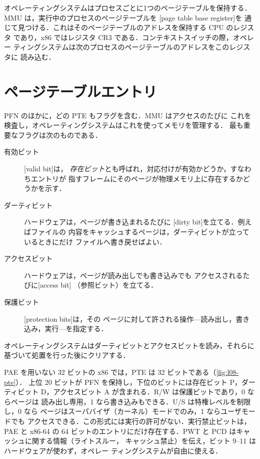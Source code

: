 \documentclass[../main.tex]{subfiles}
\begin{document}
オペレーティングシステムはプロセスごとに1つのページテーブルを保持する．MMU
は，実行中のプロセスのページテーブルを
[page table base register]を
通じて見つける．これはそのページテーブルのアドレスを保持する CPU のレジスタ
であり，x86 ではレジスタ CR3 である．コンテキストスイッチの際，オペレー
ティングシステムは次のプロセスのページテーブルのアドレスをこのレジスタに
読み込む．

\section{ページテーブルエントリ}
\label{sec:l08-pte}

PFN のほかに，どの PTE もフラグを含む．MMU はアクセスのたびに
これを検査し，オペレーティングシステムはこれを使ってメモリを管理する．
最も重要なフラグは次のものである．
\begin{description}
  \item[有効ビット] [valid bit]は，
    \emph{存在ビット}とも呼ばれ，対応付けが有効かどうか，すなわちエントリが
    指すフレームにそのページが物理メモリ上に存在するかどうかを示す．
  \item[ダーティビット] ハードウェアは，ページが書き込まれるたびに
    [dirty bit]を立てる．例えばファイルの
    内容をキャッシュするページは，ダーティビットが立っているときにだけ
    ファイルへ書き戻せばよい．
  \item[アクセスビット] ハードウェアは，ページが読み出しでも書き込みでも
    アクセスされるたびに[access bit]
    （参照ビット）を立てる．
  \item[保護ビット] [protection bits]は，その
    ページに対して許される操作---読み出し，書き込み，実行---を指定する．
\end{description}
オペレーティングシステムはダーティビットとアクセスビットを読み，それらに
基づいて処置を行った後にクリアする．

PAE を用いない 32 ビットの x86 では，PTE は 32 ビットである（\cref{fig:l08-pte}）．
上位 20 ビットが PFN を保持し，下位のビットには存在ビット P，ダーティビット
D，アクセスビット A が含まれる．R/W は保護ビットであり，0 ならページは
読み出し専用，1 なら書き込みもできる．U/S は特権レベルを制限し，0 なら
ページはスーパバイザ（カーネル）モードでのみ，1 ならユーザモードでも
アクセスできる．この形式には実行の許可がない．実行禁止ビットは，PAE と
x86-64 の 64 ビットのエントリにだけ存在する．PWT と PCD はキャッシュに関する情報（ライトスルー，
キャッシュ禁止）を伝え，ビット 9--11 はハードウェアが使わず，オペレー
ティングシステムが自由に使える．
\end{document}
